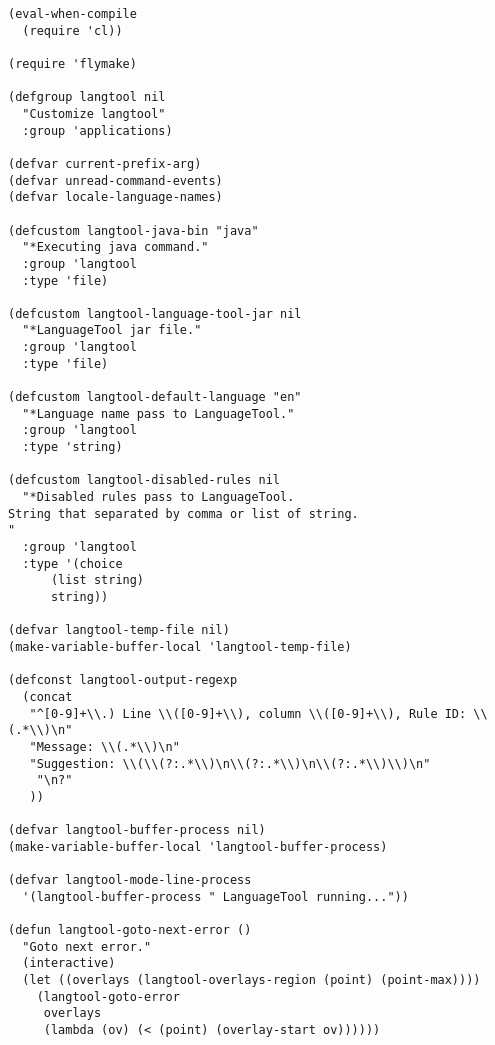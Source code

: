 \documentclass[11pt]{article}
\begin{document}
\begin{verbatim}
(eval-when-compile
  (require 'cl))

(require 'flymake)

(defgroup langtool nil
  "Customize langtool"
  :group 'applications)

(defvar current-prefix-arg)
(defvar unread-command-events)
(defvar locale-language-names)

(defcustom langtool-java-bin "java"
  "*Executing java command."
  :group 'langtool
  :type 'file)

(defcustom langtool-language-tool-jar nil
  "*LanguageTool jar file."
  :group 'langtool
  :type 'file)

(defcustom langtool-default-language "en"
  "*Language name pass to LanguageTool."
  :group 'langtool
  :type 'string)

(defcustom langtool-disabled-rules nil
  "*Disabled rules pass to LanguageTool.
String that separated by comma or list of string.
"
  :group 'langtool
  :type '(choice 
	  (list string)
	  string))

(defvar langtool-temp-file nil)
(make-variable-buffer-local 'langtool-temp-file)

(defconst langtool-output-regexp 
  (concat
   "^[0-9]+\\.) Line \\([0-9]+\\), column \\([0-9]+\\), Rule ID: \\(.*\\)\n"
   "Message: \\(.*\\)\n"
   "Suggestion: \\(\\(?:.*\\)\n\\(?:.*\\)\n\\(?:.*\\)\\)\n"
    "\n?"
   ))

(defvar langtool-buffer-process nil)
(make-variable-buffer-local 'langtool-buffer-process)

(defvar langtool-mode-line-process 
  '(langtool-buffer-process " LanguageTool running..."))

(defun langtool-goto-next-error ()
  "Goto next error."
  (interactive)
  (let ((overlays (langtool-overlays-region (point) (point-max))))
    (langtool-goto-error 
     overlays
     (lambda (ov) (< (point) (overlay-start ov))))))


\end{verbatim}
\end{document}
